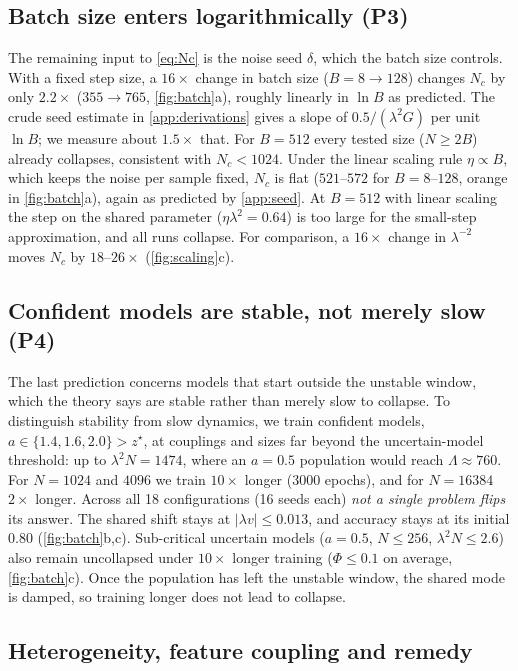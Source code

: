 \subsection{Batch size enters logarithmically (P3)}
\label{app:batch}
The remaining input to \cref{eq:Nc} is the noise seed $\delta$, which the batch size controls.
With a fixed step size, a $16\times$ change in batch size ($B=8\to128$) changes $N_c$ by only $2.2\times$ ($355\to765$, \cref{fig:batch}a), roughly linearly in $\ln B$ as predicted. The crude seed estimate in \cref{app:derivations} gives a slope of $0.5/(\lambda^2G)$ per unit $\ln B$; we measure about $1.5\times$ that.
For $B=512$ every tested size ($N\ge2B$) already collapses, consistent with $N_c<1024$.
Under the linear scaling rule $\eta\propto B$, which keeps the noise per sample fixed, $N_c$ is flat ($521$--$572$ for $B=8$--$128$, orange in \cref{fig:batch}a), again as predicted by \cref{app:seed}.
At $B=512$ with linear scaling the step on the shared parameter ($\eta\lambda^2=0.64$) is too large for the small-step approximation, and all runs collapse.
For comparison, a $16\times$ change in $\lambda^{-2}$ moves $N_c$ by $18$--$26\times$ (\cref{fig:scaling}c).

\subsection{Confident models are stable, not merely slow (P4)}
\label{app:stable}
The last prediction concerns models that start outside the unstable window, which the theory says are stable rather than merely slow to collapse.
To distinguish stability from slow dynamics, we train confident models, $a\in\{1.4,1.6,2.0\}>z^\star$, at couplings and sizes far beyond the uncertain-model threshold: up to $\lambda^2N=1474$, where an $a=0.5$ population would reach $\Lambda\approx760$.
For $N=1024$ and $4096$ we train $10\times$ longer (3000 epochs), and for $N=16384$ $2\times$ longer.
Across all 18 configurations (16 seeds each) \emph{not a single problem flips} its answer. The shared shift stays at $|\lambda v|\le0.013$, and accuracy stays at its initial $0.80$ (\cref{fig:batch}b,c).
Sub-critical uncertain models ($a=0.5$, $N\le256$, $\lambda^2N\le2.6$) also remain uncollapsed under $10\times$ longer training ($\Phi\le0.1$ on average, \cref{fig:batch}c).
Once the population has left the unstable window, the shared mode is damped, so training longer does not lead to collapse.

\subsection{Heterogeneity, feature coupling and remedy}
\label{app:hetero}
